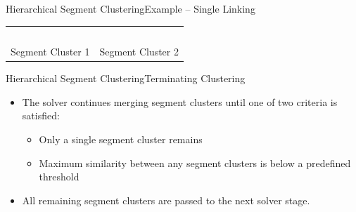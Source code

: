 \documentclass[10pt]{beamer}
\begin{document}
\begin{frame}{Hierarchical Segment Clustering}{Example -- Single Linking}
{\begin{center}
\begin{tabular}{>{\centering\arraybackslash}b{} >{\centering\arraybackslash}b{}}
		    \\~\\
		    Segment Cluster 1 & Segment Cluster 2
	  \end{tabular}
	\end{center}
	}
\end{frame}



\begin{frame}{Hierarchical Segment Clustering}{Terminating Clustering}
  \begin{itemize}
  	\item The solver continues merging segment clusters until one of two criteria is satisfied:
	  \vspace{0.4em}
	  \begin{itemize}
	    \setlength\itemsep{0.8em}
	    \item Only a single segment cluster remains
	    \item Maximum similarity between any segment clusters is below a predefined threshold
	  \end{itemize} 
	  \vspace{1.5em}
	  \item All remaining segment clusters are passed to the next solver stage.
	\end{itemize}
\end{frame}
\end{document}
